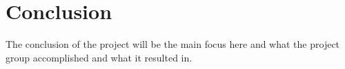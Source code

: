 \chapter{Conclusion}

The conclusion of the project will be the main focus here and what the project group accomplished and what it resulted in.